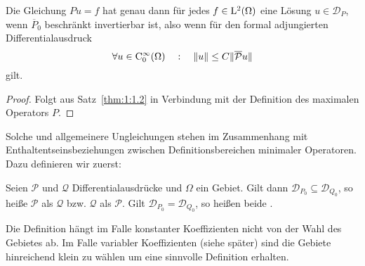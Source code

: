\begin{thm}
Die Gleichung $Pu=f$ hat genau dann für jedes $f\in\mathrm L^2(\Omega)$ eine L\"osung $u\in\mathcal D_{P}$, wenn $\overline P_0$ beschränkt invertierbar ist, also wenn f\"ur den formal adjungierten Differentialausdruck
\begin{equation}
  \forall u\in\mathrm C^\infty_0(\Omega)\quad:\quad   \|u\| \le C \| \overline{\mathcal P} u \|
\end{equation}
gilt.
\end{thm}
\begin{proof}
Folgt aus Satz~\ref{thm:1:1.2} in Verbindung mit der Definition des maximalen Operators $P$.
\end{proof}

Solche und allgemeinere Ungleichungen stehen im Zusammenhang mit Enthaltentseinsbeziehungen zwischen Definitionsbereichen minimaler Operatoren. Dazu definieren wir zuerst: 
\begin{df}
Seien $\mathcal P$ und $\mathcal Q$ Differentialausdrücke und $\Omega$ ein Gebiet. Gilt dann $\mathcal D_{P_0}\subseteq \mathcal D_{Q_0}$, so heiße $\mathcal P$  als $\mathcal Q$ bzw. $\mathcal Q$  als $\mathcal P$. Gilt $\mathcal D_{P_0}=\mathcal D_{Q_0}$, so heißen beide .
\end{df}
Die  Definition hängt im Falle konstanter Koeffizienten nicht von der Wahl des Gebietes ab. Im Falle variabler Koeffizienten (siehe später) sind die Gebiete hinreichend klein zu wählen um eine sinnvolle Definition erhalten.

